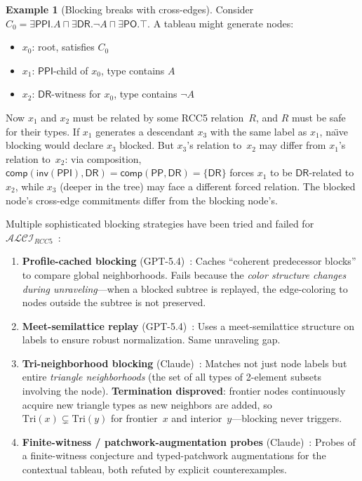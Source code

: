 \documentclass[
]{ceurart}
\theoremstyle{definition}
\newtheorem{examplex}[theorem]{Example}
\newcommand{\ALCIRCC}[1]{\ensuremath{\mathcal{ALCI}_{\mathit{RCC#1}}}}
\newcommand{\DR}{\ensuremath{\mathsf{DR}}}
\newcommand{\PO}{\ensuremath{\mathsf{PO}}}
\newcommand{\PP}{\ensuremath{\mathsf{PP}}}
\newcommand{\PPI}{\ensuremath{\mathsf{PPI}}}
\newcommand{\inv}{\ensuremath{\mathsf{inv}}}
\newcommand{\comp}{\ensuremath{\mathsf{comp}}}
\begin{document}
\begin{examplex}[Blocking breaks with cross-edges]
\label{ex:blocking-fail}
Consider $C_0 = \exists\PPI.A \sqcap \exists\DR.\neg A
\sqcap \exists\PO.\top$.
A tableau might generate nodes:
\begin{itemize}[nosep]
  \item $x_0$: root, satisfies $C_0$
  \item $x_1$: $\PPI$-child of $x_0$, type contains $A$
  \item $x_2$: $\DR$-witness for $x_0$, type contains $\neg A$
\end{itemize}
Now $x_1$ and $x_2$ must be related by some RCC5 relation~$R$,
and $R$ must be safe for their types.  If $x_1$ generates a
descendant $x_3$ with the same label as $x_1$, na\"{\i}ve blocking
would declare $x_3$ blocked.  But $x_3$'s relation to~$x_2$ may
differ from $x_1$'s relation to~$x_2$: via composition,
$\comp(\inv(\PPI), \DR) = \comp(\PP, \DR) = \{\DR\}$ forces
$x_1$ to be $\DR$-related to~$x_2$, while $x_3$ (deeper in the
tree) may face a different forced relation.  The blocked node's
cross-edge commitments differ from the blocking node's.
\end{examplex}

Multiple sophisticated blocking strategies have been tried and
failed for $\ALCIRCC{5}$~\cite{ALCIRCC5Outdated,StatusAfterFW,ResponseGPTBlocking}:
\begin{enumerate}
  \item \textbf{Profile-cached blocking} (GPT-5.4)~\cite{ResponseGPTBlocking}: Caches
    ``coherent predecessor blocks'' to compare global neighborhoods.
    Fails because the \emph{color structure changes during
    unraveling}---when a blocked subtree is replayed, the
    edge-coloring to nodes outside the subtree is not preserved.
  \item \textbf{Meet-semilattice replay} (GPT-5.4)~\cite{ResponseGPTBlocking}: Uses a
    meet-semilattice structure on labels to ensure robust
    normalization.  Same unraveling gap.
  \item \textbf{Tri-neighborhood blocking} (Claude)~\cite{TriangleBlocking}: Matches not
    just node labels but entire \emph{triangle neighborhoods}
    (the set of all types of 2-element subsets involving the node).
    \textbf{Termination disproved}: frontier nodes continuously
    acquire new triangle types as new neighbors are added, so
    $\mathrm{Tri}(x) \subsetneq \mathrm{Tri}(y)$ for frontier~$x$
    and interior~$y$---blocking never triggers.
  \item \textbf{Finite-witness / patchwork-augmentation probes}
    (Claude)~\cite{FWProof,PatchworkAugmentation,TypedPatchworkCounterexample}:
    Probes of a finite-witness conjecture and typed-patchwork
    augmentations for the contextual tableau, both refuted by
    explicit counterexamples.
\end{enumerate}
\end{document}

